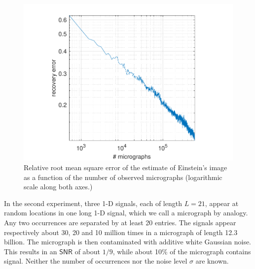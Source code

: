 \documentclass[english,11pt]{article}
\newcommand{\1}{\mathbf{1}}
\numberwithin{equation}{section}
\theoremstyle{plain}
\theoremstyle{definition}
\theoremstyle{remark}
\theoremstyle{plain}
\theoremstyle{remark}
\theoremstyle{plain}
\theoremstyle{plain}
\newcommand{\SNR}{\ensuremath{\textsf{SNR}}}
\begin{document}
\begin{figure}[h]
\centering
\includegraphics[scale=.7]{Einstein_progress}
\caption{\label{fig:error_per_micro} Relative root mean square error of the estimate of Einstein's image as a function of the number of observed micrographs (logarithmic scale along both axes.)}
\end{figure}



%


In the second experiment, three 1-D signals, each of length $L = 21$, appear at random locations in one long 1-D signal, which we call a micrograph by analogy. Any two occurrences are separated by at least 20 entries. The signals appear respectively about 30, 20 and 10 million times in a micrograph of length 12.3 billion. The micrograph is then contaminated with additive white Gaussian noise. This results in an $\SNR$ of about $1/9$, while about 10\% of the micrograph contains signal. Neither the number of occurrences nor the noise level $\sigma$ are known.
\end{document}
